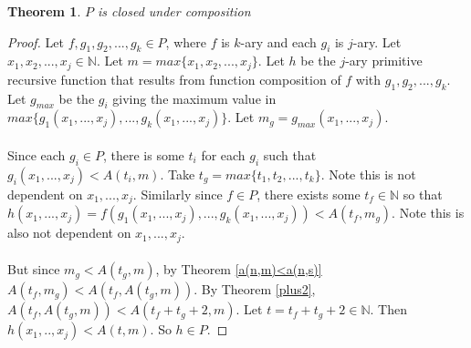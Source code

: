 \documentclass[12pt, letterpaper]{article}
\newtheorem{theorem}{Theorem}
\theoremstyle{case}
\begin{document}
    \begin{theorem}
      $P$ is closed under composition
    \end{theorem}
    \begin{proof}
      Let $f, g_1, g_2, ..., g_k \in P$, where $f$ is $k$-ary and each $g_i$ is $j$-ary.
      Let $x_1, x_2, ..., x_j \in \mathbb{N}$.
      Let $m = max\{x_1, x_2, ..., x_j\}$.
      Let $h$ be the $j$-ary primitive recursive function that results from function composition of $f$ with $g_1, g_2, ..., g_k$.
      Let $g_{max}$ be the $g_i$ giving the maximum value in
      \\
      $max\{g_1(x_1, ..., x_j), ..., g_k(x_1, ..., x_j)\}$.
      Let $m_g = g_{max}(x_1, ..., x_j)$.
      \\
      \\
      Since each $g_i \in P$, there is some $t_i$ for each $g_i$ such that $g_i(x_1, ..., x_j) < A(t_i, m)$.
      Take $t_g = max\{t_1, t_2, ..., t_k\}$. Note this is not dependent on $x_1, ..., x_j$.
      Similarly since $f \in P$, there exists some $t_f \in \mathbb{N}$ so that $h(x_1, ..., x_j) = f(g_1(x_1, ..., x_j), ..., g_k(x_1, ..., x_j)) < A(t_f, m_g)$.
      Note this is also not dependent on $x_1, ..., x_j$.
      \\
      \\
      But since $m_g < A(t_g, m)$, by Theorem \ref{a(n,m)<a(n,s)} $A(t_f, m_g) < A(t_f, A(t_g, m))$.
      By Theorem \ref{plus2}, $A(t_f, A(t_g, m)) < A(t_f + t_g + 2, m)$.
      Let $t = t_f + t_g + 2 \in \mathbb{N}$.
      Then $h(x_1, .., x_j) < A(t, m)$.
      So $h \in P$.
    \end{proof}
\end{document}
